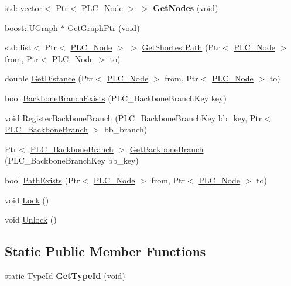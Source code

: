 \begin{DoxyCompactItemize}
\item 
\hypertarget{classns3_1_1PLC__Graph_a6cd95bff61b3364b44b61315a421c271}{std\-::vector$<$ \-Ptr$<$ \hyperlink{classns3_1_1PLC__Node}{\-P\-L\-C\-\_\-\-Node} $>$ $>$ {\bfseries \-Get\-Nodes} (void)}\label{classns3_1_1PLC__Graph_a6cd95bff61b3364b44b61315a421c271}

\item 
boost\-::\-U\-Graph $\ast$ \hyperlink{classns3_1_1PLC__Graph_ad3c87c152e0a7e4162843aaac261380e}{\-Get\-Graph\-Ptr} (void)
\item 
std\-::list$<$ \-Ptr$<$ \hyperlink{classns3_1_1PLC__Node}{\-P\-L\-C\-\_\-\-Node} $>$ $>$ \hyperlink{classns3_1_1PLC__Graph_aa09a9dcbc563e6c4d4611308a8f3c0a1}{\-Get\-Shortest\-Path} (\-Ptr$<$ \hyperlink{classns3_1_1PLC__Node}{\-P\-L\-C\-\_\-\-Node} $>$ from, \-Ptr$<$ \hyperlink{classns3_1_1PLC__Node}{\-P\-L\-C\-\_\-\-Node} $>$ to)
\item 
double \hyperlink{classns3_1_1PLC__Graph_a484285d6736dd5515154837db21fa769}{\-Get\-Distance} (\-Ptr$<$ \hyperlink{classns3_1_1PLC__Node}{\-P\-L\-C\-\_\-\-Node} $>$ from, \-Ptr$<$ \hyperlink{classns3_1_1PLC__Node}{\-P\-L\-C\-\_\-\-Node} $>$ to)
\item 
bool \hyperlink{classns3_1_1PLC__Graph_a39b4b9720fc281cd55c1ff29d1f03552}{\-Backbone\-Branch\-Exists} (\-P\-L\-C\-\_\-\-Backbone\-Branch\-Key key)
\item 
void \hyperlink{classns3_1_1PLC__Graph_a0715ae252ce170c59ffe5325ef8bcd56}{\-Register\-Backbone\-Branch} (\-P\-L\-C\-\_\-\-Backbone\-Branch\-Key bb\-\_\-key, \-Ptr$<$ \hyperlink{classns3_1_1PLC__BackboneBranch}{\-P\-L\-C\-\_\-\-Backbone\-Branch} $>$ bb\-\_\-branch)
\item 
\-Ptr$<$ \hyperlink{classns3_1_1PLC__BackboneBranch}{\-P\-L\-C\-\_\-\-Backbone\-Branch} $>$ \hyperlink{classns3_1_1PLC__Graph_a6367c91dfdb82fefddcafdf0f871efde}{\-Get\-Backbone\-Branch} (\-P\-L\-C\-\_\-\-Backbone\-Branch\-Key bb\-\_\-key)
\item 
bool \hyperlink{classns3_1_1PLC__Graph_ad0a93aaa9331850a8d5a96355aa7e7f1}{\-Path\-Exists} (\-Ptr$<$ \hyperlink{classns3_1_1PLC__Node}{\-P\-L\-C\-\_\-\-Node} $>$ from, \-Ptr$<$ \hyperlink{classns3_1_1PLC__Node}{\-P\-L\-C\-\_\-\-Node} $>$ to)
\item 
void \hyperlink{classns3_1_1PLC__Graph_acf2804c3aeefe4d619d337c88676f288}{\-Lock} ()
\item 
void \hyperlink{classns3_1_1PLC__Graph_a42e820f44e236404054f5c9245d404a5}{\-Unlock} ()
\end{DoxyCompactItemize}
\subsection*{\-Static \-Public \-Member \-Functions}
\begin{DoxyCompactItemize}
\item 
\hypertarget{classns3_1_1PLC__Graph_acbdb07d6ea6b298299ebba538b32c5f8}{static \-Type\-Id {\bfseries \-Get\-Type\-Id} (void)}\label{classns3_1_1PLC__Graph_acbdb07d6ea6b298299ebba538b32c5f8}

\end{DoxyCompactItemize}
